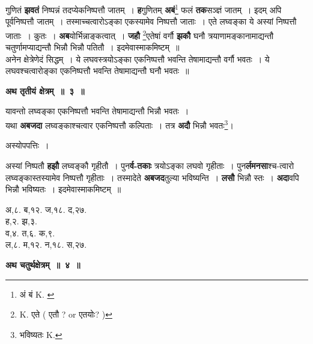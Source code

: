 \documentclass[11pt, openany]{book}
\begin{document}
\noindent गुणितं \textbf{झवतं} निष्पन्नं तदप्येकनिष्पत्तौ जातम्~। \textbf{ह}गुणितम् \textbf{अबं}\renewcommand{\thefootnote}{१}\footnote{अं बं {\en K. }} फलं \textbf{तक}सञ्ज्ञं जातम्~। इदम् अपि पूर्वनिष्पत्तौ जातम्~। तस्माच्चत्वारोऽङ्का एकस्यामेव निष्पत्तौ जाताः~। एते लघ्वङ्का ये अस्यां निष्पत्तौ जाताः~। कुतः~। \textbf{अब}योर्भिन्नाङ्कत्वात्~। \textbf{जहौ} \renewcommand{\thefootnote}{२}\footnote{{\en K.} एते ( एतौ ? {\en or} एतयोः? )}एतेषां वर्गौ \textbf{झकौ} घनौ त्रयाणामङ्कानामाद्यन्तौ चतुर्णामप्याद्यन्तौ भिन्नौ भिन्नौ पतितौ~। इदमेवास्माकमिष्टम्~॥ \\

 अनेन क्षेत्रेणेदं सिद्धम्~। ये लघवस्त्रयोऽङ्का एकनिष्पत्तौ भवन्ति तेषामाद्यन्तौ वर्गौ भवतः~। ये लघवश्चत्वारोङ्का एकनिष्पत्तौ भवन्ति तेषामाद्यन्तौ घनौ भवतः~॥ 
\vspace{2mm}

\begin{center}
 \textbf{\large अथ तृतीयं क्षेत्रम्~॥~३~॥}
\end{center}

{\ab  यावन्तो लघ्वङ्का एकनिष्पत्तौ भवन्ति तेषामाद्यन्तौ भिन्नौ भवतः~। }\\

 यथा \textbf{अबजदा} लघ्वङ्काश्चत्वार एकनिष्पत्तौ कल्पिताः~। तत्र \textbf{अदौ} भिन्नौ भवतः\renewcommand{\thefootnote}{३}\footnote{भविष्यतः {\en K.}}\;।
 
\begin{center}
अस्योपपत्तिः~।
\end{center}

\begin{flushleft}
\begin{minipage}[t]{0.57\textwidth}
\hspace{4mm} अस्यां निष्पतौ \textbf{हझौ} लघ्वङ्कौ गृहीतौ~। पुन\textbf{र्व-तकाः} त्रयोऽङ्का लघवो गृहीताः~। पुन\textbf{र्लमनसा}श्च-त्वारो लघ्वङ्कास्तस्यामेव निष्पत्तौ गृहीताः~। तस्मादेते \textbf{अबजद}तुल्या भविष्यन्ति~। \textbf{लसौ} भिन्नौ स्तः~। \textbf{अदा}वपि भिन्नौ भविष्यतः~। इदमेवास्माकमिष्टम्~॥
\end{minipage} 
\hfill
\begin{minipage}[t]{0.34\textwidth}
अ,८. ब,१२. ज,१८. द,२७.\\
ह,२. झ,३. \\
व,४. त,६. क,९.\\
ल,८. म,१२. न,१८. स,२७.
\end{minipage}
\end{flushleft}

\newpage
\begin{center} 
 \textbf{\large अथ चतुर्थक्षेत्रम्~॥~४~॥}
 \end{center}
\end{document}
